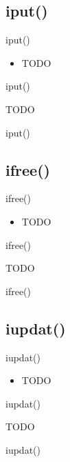 \documentclass{beamer}
\begin{document}


\subsection{iput()}

\begin{frame}{iput()}
    \begin{itemize}
        \item TODO
    \end{itemize}
\end{frame}

\begin{frame}{iput()}
    \begin{algorithmic}[1]
        \State TODO
    \end{algorithmic}
\end{frame}

\begin{frame}{iput()}
\end{frame}




\subsection{ifree()}

\begin{frame}{ifree()}
    \begin{itemize}
        \item TODO
    \end{itemize}
\end{frame}

\begin{frame}{ifree()}
    \begin{algorithmic}[1]
        \State TODO
    \end{algorithmic}
\end{frame}

\begin{frame}{ifree()}
\end{frame}




\subsection{iupdat()}

\begin{frame}{iupdat()}
    \begin{itemize}
        \item TODO
    \end{itemize}
\end{frame}

\begin{frame}{iupdat()}
    \begin{algorithmic}[1]
        \State TODO
    \end{algorithmic}
\end{frame}

\begin{frame}{iupdat()}
\end{frame}
\end{document}
